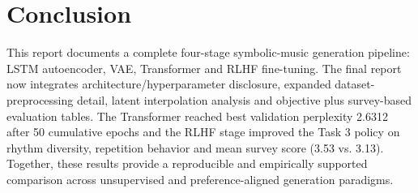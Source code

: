 \documentclass[conference]{IEEEtran}
\begin{document}
\section{Conclusion}
This report documents a complete four-stage symbolic-music generation pipeline: LSTM autoencoder, VAE, Transformer and RLHF fine-tuning. The final report now integrates architecture/hyperparameter disclosure, expanded dataset-preprocessing detail, latent interpolation analysis and objective plus survey-based evaluation tables. The Transformer reached best validation perplexity 2.6312 after 50 cumulative epochs and the RLHF stage improved the Task 3 policy on rhythm diversity, repetition behavior and mean survey score (3.53 vs. 3.13). Together, these results provide a reproducible and empirically supported comparison across unsupervised and preference-aligned generation paradigms.

\nocite{*}



\end{document}

